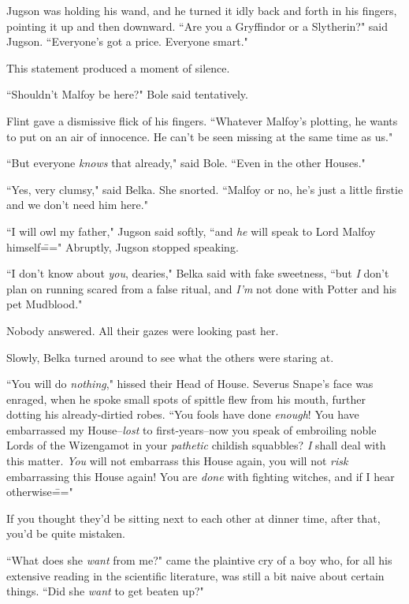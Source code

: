Jugson was holding his wand, and he turned it idly back and forth in his fingers, pointing it up and then downward. ``Are you a Gryffindor or a Slytherin?" said Jugson. ``Everyone's got a price. Everyone smart."

This statement produced a moment of silence.

``Shouldn't Malfoy be here?" Bole said tentatively.

Flint gave a dismissive flick of his fingers. ``Whatever Malfoy's plotting, he wants to put on an air of innocence. He can't be seen missing at the same time as us."

``But everyone \emph{knows} that already," said Bole. ``Even in the other Houses."

``Yes, very clumsy," said Belka. She snorted. ``Malfoy or no, he's just a little firstie and we don't need him here."

``I will owl my father," Jugson said softly, ``and \emph{he} will speak to Lord Malfoy himself\===" Abruptly, Jugson stopped speaking.

``I don't know about \emph{you}, dearies," Belka said with fake sweetness, ``but \emph{I} don't plan on running scared from a false ritual, and \emph{I'm} not done with Potter and his pet Mudblood."

Nobody answered. All their gazes were looking past her.

Slowly, Belka turned around to see what the others were staring at.

``You will do \emph{nothing}," hissed their Head of House. Severus Snape's face was enraged, when he spoke small spots of spittle flew from his mouth, further dotting his already-dirtied robes. ``You fools have done \emph{enough}! You have embarrassed my House\---\emph{lost} to first-years\---now you speak of embroiling noble Lords of the Wizengamot in your \emph{pathetic} childish squabbles? \emph{I} shall deal with this matter. \emph{You} will not embarrass this House again, you will not \emph{risk} embarrassing this House again! You are \emph{done} with fighting witches, and if I hear otherwise\==="

\later

If you thought they'd be sitting next to each other at dinner time, after that, you'd be quite mistaken.

``What does she \emph{want} from me?" came the plaintive cry of a boy who, for all his extensive reading in the scientific literature, was still a bit naive about certain things. ``Did she \emph{want} to get beaten up?"


